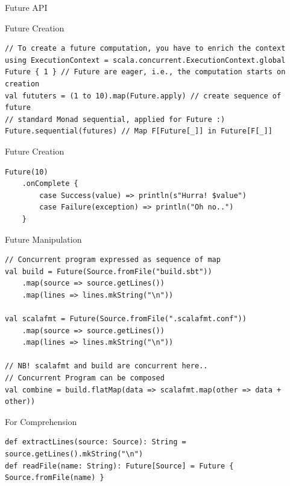 \documentclass[presentation, 9pt]{beamer}\mode<presentation>{\usetheme{AMSBolognaFC}}
\begin{document}
\begin{frame}{Future API}
	\begin{alertblock}{Future Creation}
 \begin{tcolorbox}[left=0pt, top=0pt, bottom=0pt]
				\begin{verbatim}
// To create a future computation, you have to enrich the context
using ExecutionContext = scala.concurrent.ExecutionContext.global
Future { 1 } // Future are eager, i.e., the computation starts on creation
val fututers = (1 to 10).map(Future.apply) // create sequence of future
// standard Monad sequential, applied for Future :)
Future.sequential(futures) // Map F[Future[_]] in Future[F[_]]
				\end{verbatim}
			\end{tcolorbox}
	\end{alertblock}
	\begin{alertblock}{Future Creation}
		\begin{tcolorbox}[left=0pt, top=0pt, bottom=0pt]
					 \begin{verbatim}
Future(10)
	.onComplete {
		case Success(value) => println(s"Hurra! $value")
		case Failure(exception) => println("Oh no..")
	}
					 \end{verbatim}
				 \end{tcolorbox}
		 \end{alertblock}
		 
\begin{alertblock}{Future Manipulation}
	\begin{tcolorbox}[left=0pt, top=0pt, bottom=0pt]
					\begin{verbatim}
// Concurrent program expressed as sequence of map
val build = Future(Source.fromFile("build.sbt"))
	.map(source => source.getLines())
	.map(lines => lines.mkString("\n"))

val scalafmt = Future(Source.fromFile(".scalafmt.conf"))
	.map(source => source.getLines())
	.map(lines => lines.mkString("\n"))

// NB! scalafmt and build are concurrent here..
// Concurrent Program can be composed
val combine = build.flatMap(data => scalafmt.map(other => data + other)) 
					\end{verbatim}
				\end{tcolorbox}
\end{alertblock}
\begin{alertblock}{For Comprehension }
	\begin{tcolorbox}[left=0pt, top=0pt, bottom=0pt]
					\begin{verbatim}
def extractLines(source: Source): String = source.getLines().mkString("\n")
def readFile(name: String): Future[Source] = Future { Source.fromFile(name) }


\end{verbatim}
\end{tcolorbox}
\end{alertblock}
\end{frame}
\end{document}
